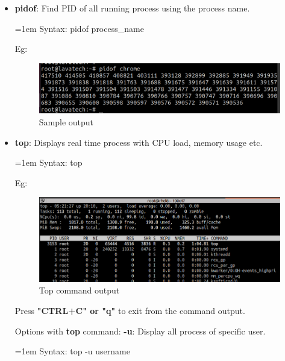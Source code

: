 \begin{flushleft}
\begin{itemize}
	\bigskip
	\bigskip
	
	\item \textbf{pidof}: Find PID of all running process using the process name.
	\bigskip
	\begin{tcolorbox}[breakable,notitle,boxrule=-0pt,colback=pink,colframe=pink]
		\color{black}
		\font=1em
		Syntax: pidof process\_name
		\font=4pt
	\end{tcolorbox}
	
	Eg:
	\begin{figure}[h!]
		\centering
		\includegraphics[scale=.35]{content/chapter12/images/pidof.png}
		\caption{Sample output}
		\label{fig:process23454922}
	\end{figure}
	
	
	\newpage
	
	\item \textbf{top}: Displays real time process with CPU load, memory usage etc.
	\bigskip
	\begin{tcolorbox}[breakable,notitle,boxrule=-0pt,colback=pink,colframe=pink]
		\color{black}
		\font=1em
		Syntax: top
		\font=4pt
	\end{tcolorbox}

	Eg:	
	\bigskip
	\begin{figure}[h!]
		\centering
		\includegraphics[scale=0.4]{content/chapter12/images/top_command.png}
		\caption{Top command output}
		\label{fig:top_command_output}
	\end{figure}
	Press \textbf{"CTRL+C" or "q"} to exit from the command output.
	
	\newline
	\bigskip
	Options with \textbf{top} command:
	\newline
	\textbf{-u}: Display all process of specific user.
	\bigskip
	\begin{tcolorbox}[breakable,notitle,boxrule=-0pt,colback=pink,colframe=pink]
		\color{black}
		\font=1em
		Syntax: top -u username
		\font=4pt
	\end{tcolorbox}
	

\end{itemize}
\end{flushleft}
